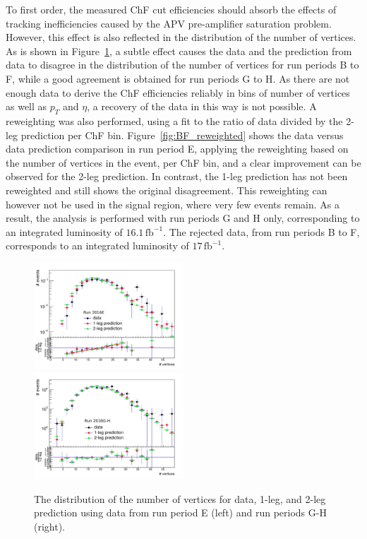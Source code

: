 To first order, the measured ChF cut efficiencies should absorb the effects of tracking inefficiencies caused by the APV pre-amplifier saturation problem. However, this effect is also reflected in the distribution of the number of vertices. As is shown in Figure~\ref{fig:nvtx_reweighting}, a subtle effect causes the data and the prediction from data to disagree in the distribution of the number of vertices for run periods B to F, while a good agreement is obtained for run periods G to H. As there are not enough data to derive the ChF efficiencies reliably in bins of number of vertices as well as $p_T$ and $\eta$, a recovery of the data in this way is not possible. A reweighting was also performed, using a fit to the ratio of data divided by the 2-leg prediction per ChF bin. Figure~\ref{fig:BF_reweighted} shows the data versus data prediction comparison in run period E, applying the reweighting based on the number of vertices in the event, per ChF bin, and a clear improvement can be observed for the 2-leg prediction. In contrast, the 1-leg prediction has not been reweighted and still shows the original disagreement. This reweighting can however not be used in the signal region, where very few events remain. As a result, the analysis is performed with run periods G and H only, corresponding to an integrated luminosity of $16.1\,\mathrm{fb^{-1}}$. The rejected data, from run periods B to F, corresponds to an integrated luminosity of $17\, \mathrm{fb}^{-1}$.

\begin{figure}[ht]
  \centering
  \includegraphics[width=0.5\textwidth]{figures/Data_distributions_excl_RunE_ChF0p25To0p3_nvtx.pdf}\hfill%
  \includegraphics[width=0.5\textwidth]{figures/RunGH_ChF0p25To0p3_nvtx.pdf}
  \caption{The distribution of the number of vertices for data, 1-leg, and 2-leg prediction using data from run period E (left) and run periods G-H (right).}
  \label{fig:nvtx_reweighting}
\end{figure}

